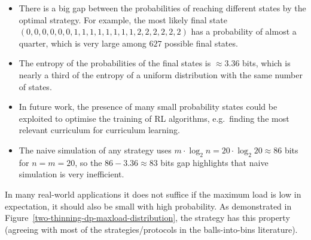 \begin{itemize}
    \item There is a big gap between the probabilities of reaching different states by the optimal strategy. For example, the most likely final state $(0, 0, 0, 0, 0, 0, 1, 1, 1, 1, 1, 1, 1, 1, 2, 2, 2, 2, 2, 2)$ has a probability of almost a quarter, which is very large among $627$ possible final states. 
    \item The entropy of the probabilities of the final states is $\approx 3.36$ bits, which is nearly a third of the entropy of a uniform distribution with the same number of states.
    \item In future work, the presence of many small probability states could be exploited to optimise the training of RL algorithms, e.g.\ finding the most relevant curriculum for curriculum learning.
    \item The naive simulation of any strategy uses $m\cdot \log_2 n=20\cdot \log_2 20\approx 86$ bits for $n=m=20$, so the $86-3.36\approx 83$ bits gap highlights that naive simulation is very inefficient.
\end{itemize}


In many real-world applications it does not suffice if the maximum load is low in expectation, it should also be small with high probability. As demonstrated in Figure~\ref{two-thinning-dp-maxload-distribution}, the \DP strategy has this property (agreeing with most of the strategies/protocols in the balls-into-bins literature).


